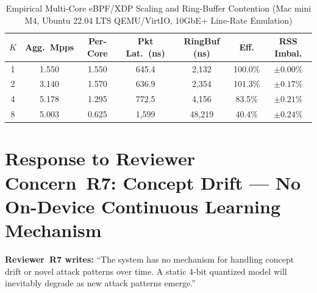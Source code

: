 \documentclass[10pt,letterpaper]{article}
\begin{document}
\begin{table}[!ht]
\centering
\caption{Empirical Multi-Core eBPF/XDP Scaling and Ring-Buffer Contention
(Mac mini M4, Ubuntu 22.04 LTS QEMU/VirtIO, 10GbE+ Line-Rate Emulation)}
\label{tab:multicore}
\small
\begin{tabular}{ccccccc}
\toprule
$K$ & Agg.\ Mpps & Per-Core & Pkt Lat.\ (ns) & RingBuf (ns) & Eff. & RSS Imbal. \\
\midrule
1 & 1.550 & 1.550 & 645.4    & 2{,}132  & 100.0\% & $\pm 0.00\%$ \\
2 & 3.140 & 1.570 & 636.9    & 2{,}354  & 101.3\% & $\pm 0.17\%$ \\
4 & 5.178 & 1.295 & 772.5    & 4{,}156  &  83.5\% & $\pm 0.21\%$ \\
8 & 5.003 & 0.625 & 1{,}599  & 48{,}219 &  40.4\% & $\pm 0.24\%$ \\
\bottomrule
\end{tabular}
\end{table}

\section{Response to Reviewer Concern~R7: Concept Drift ---
No On-Device Continuous Learning Mechanism}

\begin{reviewerbox}
\textbf{Reviewer~R7 writes:} ``The system has no mechanism for handling
concept drift or novel attack patterns over time. A static 4-bit quantized
model will inevitably degrade as new attack patterns emerge.''
\end{reviewerbox}
\end{document}
